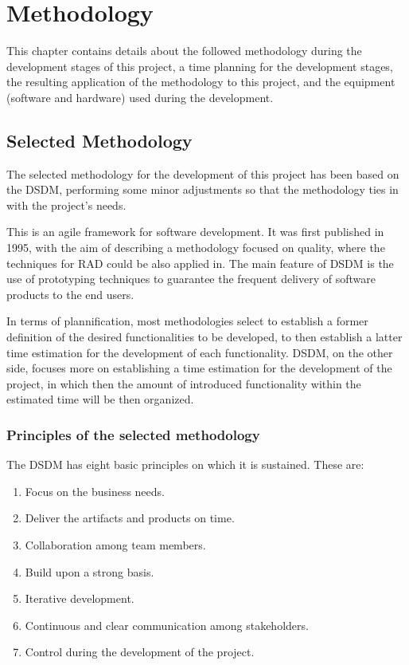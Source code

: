 \chapter{Methodology}
\label{cap:Methodology}

This chapter contains details about the followed methodology during the development stages of this project, a time planning for the development stages, the resulting
application of the methodology to this project, and the equipment (software and hardware) used during the development.

\section{Selected Methodology}\label{sec:DSDM}

The selected methodology for the development of this project has been based on the \acrfull{DSDM}, performing some minor adjustments so that the methodology ties in with the project's
needs.

This is an agile framework for software development. It was first published in 1995, with the aim of describing a methodology focused on quality, where the techniques 
for \acrfull{RAD} could be also applied in. The main feature of \acrshort{DSDM} is the use of prototyping techniques to guarantee the frequent delivery of software 
products to the end users\cite{dsdmintro}.

In terms of plannification, most methodologies select to establish a former definition of the desired functionalities to be developed, to then establish a latter time estimation
for the development of each functionality. \acrshort{DSDM}, on the other side, focuses more on establishing a time estimation for the development of the project, in which then the
amount of introduced functionality within the estimated time will be then organized\cite{agileplanning}.

\subsection{Principles of the selected methodology}\label{sec:DSDMPrinciples}

The \acrshort{DSDM} has eight basic principles on which it is sustained. These are:

\begin{enumerate}
    \item Focus on the business needs.
    \item Deliver the artifacts and products on time.
    \item Collaboration among team members.
    \item Build upon a strong basis.
    \item Iterative development.
    \item Continuous and clear communication among stakeholders.
    \item Control during the development of the project.
\end{enumerate}

